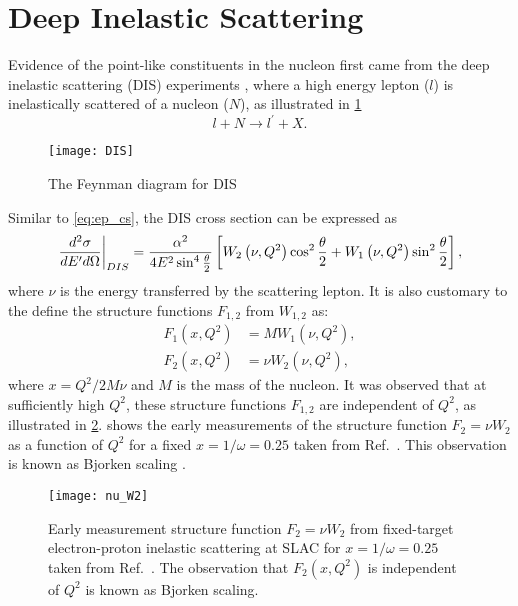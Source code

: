 \documentclass[../main.tex]{subfiles}
\begin{document}
\section{Deep Inelastic Scattering}
\label{sec:dis}
Evidence of the point-like constituents in the nucleon first came from the deep
inelastic scattering (DIS) experiments \cite{breidenbach1969}, where a high
energy lepton ($l$) is inelastically scattered of a nucleon ($N$), as
illustrated in \cref{fig:DIS}
\begin{equation}
	l + N \rightarrow l^\prime + X.
\end{equation}
\begin{figure}[htbp!]
	\centering
	\texttt{[image: DIS]}
	\caption{The Feynman diagram for DIS}
	\label{fig:DIS}
\end{figure}
Similar to \cref{eq:ep_cs}, the DIS cross section can be expressed as
\begin{equation}
	\eval{\frac{d^2\sigma}{dE^\prime d\Omega}}_{DIS} = \frac{\alpha^2}{4E^2 \sin^4
		\frac{\theta}{2}} \left[ W_2\left(\nu,Q^2\right)\cos^2
		\frac{\theta}{2} + W_1\left(\nu,Q^2\right)\sin^2 \frac{\theta}{2}
		\right],
	\label{eq:DIS_cs1}
\end{equation}
where $\nu$ is the energy transferred by the scattering lepton. It is also
customary to the define the structure functions $F_{1,2}$ from $W_{1,2}$ as:
\begin{equation}
	\begin{split}
		F_1\left(x,Q^2\right) &= MW_1\left(\nu,Q^2\right),\\
		F_2\left(x,Q^2\right) &= \nu W_2\left(\nu,Q^2\right),
	\end{split}
\end{equation}
where $x=Q^2/2M\nu$ and $M$ is the mass of the nucleon. It was observed that at sufficiently high $Q^2$,
these structure functions $F_{1,2}$ are independent of $Q^2$, as illustrated in
\cref{fig:w2}.  shows the early measurements of the
structure function $F_2=\nu W_2$ as a function of $Q^2$ for a fixed
$x=1/\omega=0.25$ taken from Ref.~\cite{friedman1972}. This observation is
known as Bjorken scaling \cite{bjorken1969}.
\begin{figure}[htpb!]
	\centering
	\texttt{[image: nu\_W2]}
	\caption{Early measurement structure function $F_2=\nu W_2$ from
		fixed-target electron-proton inelastic scattering at SLAC for
		$x=1/\omega=0.25$ taken from Ref.~\cite{friedman1972}. The observation
		that $F_2(x,Q^2)$ is independent of $Q^2$ is known as Bjorken scaling. }
	\label{fig:w2}
\end{figure}
\end{document}

